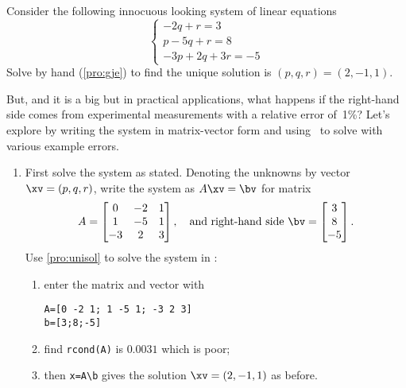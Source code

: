 \begin{example} \label{eg:ilsle}
Consider the following innocuous looking system of linear equations
\begin{equation*}
\begin{cases}
-2q+r=3
\\p-5q+r=8
\\-3p+2q+3r=-5
\end{cases}
\end{equation*}
Solve by hand (\autoref{pro:gje}) to find the unique solution is \((p,q,r)=(2,-1,1)\).

But, and it is a big but in practical applications, what happens if the right-hand side comes from experimental measurements with a relative error of~1\%? 
Let's explore by writing the system in matrix-vector form and using \script\ to solve with various example errors.
\begin{enumerate}
\item First solve the system as stated.  
Denoting the unknowns by vector \(\xv=(p,q,r)\), write the system as \(A\xv=\bv\) for matrix
\begin{equation*}
A=\begin{bmatrix} 0&-2&1
\\1&-5&1
\\-3&2&3 \end{bmatrix},
\quad\text{and right-hand side }
\bv=\begin{bmatrix} 3\\8\\-5 \end{bmatrix}.
\end{equation*}
Use \autoref{pro:unisol} to solve the system in \script:
\begin{enumerate}
\item enter the matrix and vector with
\setbox\ajrqrbox\hbox{}%
\marginpar{\usebox{\ajrqrbox\\[2ex]}}%
\begin{verbatim}
A=[0 -2 1; 1 -5 1; -3 2 3]
b=[3;8;-5]
\end{verbatim}
\item find \verb|rcond(A)| is \(0.0031\) which is poor;
\item then \verb|x=A\b| gives the solution \(\xv=(2,-1,1)\) as before.
\end{enumerate}


\end{enumerate}
\end{example}
